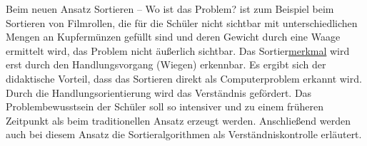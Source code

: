 \documentclass[12pt]{scrartcl}
\begin{document}
Beim neuen Ansatz \glqq Sortieren -- Wo ist das Problem?\grqq{} ist zum Beispiel beim Sortieren von Filmrollen, die für die Schüler nicht sichtbar mit unterschiedlichen Mengen an Kupfermünzen gefüllt sind und deren Gewicht durch eine Waage ermittelt wird, das Problem nicht äußerlich sichtbar.
Das Sortier\underline{merkmal} wird erst durch den Handlungsvorgang (Wiegen) erkennbar.
Es ergibt sich der didaktische Vorteil, dass das Sortieren direkt als Computerproblem erkannt wird.
Durch die Handlungsorientierung wird das Verständnis gefördert. Das Problembewusstsein der Schüler soll so intensiver und zu einem früheren Zeitpunkt als beim traditionellen Ansatz erzeugt werden.
Anschließend werden auch bei diesem Ansatz die Sortieralgorithmen als Verständniskontrolle erläutert.
\end{document}

